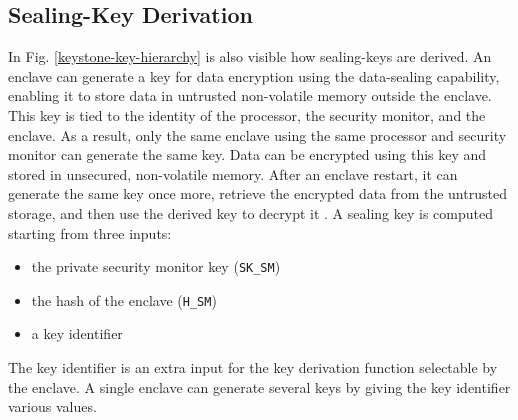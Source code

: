 \subsection{Sealing-Key Derivation}
In Fig. \ref{keystone-key-hierarchy} is also visible how sealing-keys are derived. An enclave can generate a key for data encryption using the data-sealing capability, enabling it to store data in untrusted non-volatile memory outside the enclave. This key is tied to the identity of the processor, the security monitor, and the enclave. As a result, only the same enclave using the same processor and security monitor can generate the same key. Data can be encrypted using this key and stored in unsecured, non-volatile memory. After an enclave restart, it can generate the same key once more, retrieve the encrypted data from the untrusted storage, and then use the derived key to decrypt it \cite{keystone-doc}.
A sealing key is computed starting from three inputs:
\begin{itemize}
    \item the private security monitor key (\texttt{SK\_SM})
    \item the hash of the enclave (\texttt{H\_SM})
    \item a key identifier
\end{itemize}
The key identifier is an extra input for the key derivation function selectable by the enclave. A single enclave can generate several keys by giving the key identifier various values.


